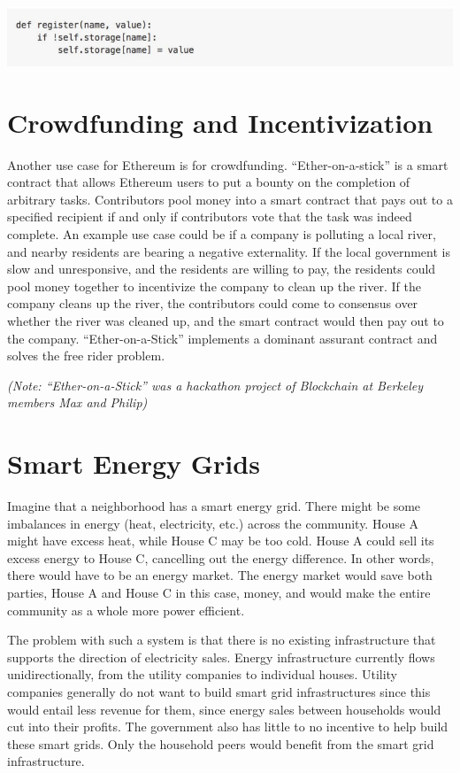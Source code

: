 \documentclass[full.tex]{subfiles}
\begin{document}
    \begin{center}
        \includegraphics[scale=0.5]{public_registry}
    \end{center}
    
    \section*{Crowdfunding and Incentivization}
    
    Another use case for Ethereum is for crowdfunding. ``Ether-on-a-stick'' is a smart contract that allows Ethereum users to put a bounty on the completion of arbitrary tasks. Contributors pool money into a smart contract that pays out to a specified recipient if and only if contributors vote that the task was indeed complete. An example use case could be if a company is polluting a local river, and nearby residents are bearing a negative externality. If the local government is slow and unresponsive, and the residents are willing to pay, the residents could pool money together to incentivize the company to clean up the river. If the company cleans up the river, the contributors could come to consensus over whether the river was cleaned up, and the smart contract would then pay out to the company. ``Ether-on-a-Stick'' implements a dominant assurant contract and solves the free rider problem.
    
    \textit{(Note: ``Ether-on-a-Stick'' was a hackathon project of Blockchain at Berkeley members Max and Philip)}
    
    \section*{Smart Energy Grids}
    
    Imagine that a neighborhood has a smart energy grid. There might be some imbalances in energy (heat, electricity, etc.) across the community. House A might have excess heat, while House C may be too cold. House A could sell its excess energy to House C, cancelling out the energy difference. In other words, there would have to be an energy market. The energy market would save both parties, House A and House C in this case, money, and would make the entire community as a whole more power efficient. 
    
    The problem with such a system is that there is no existing infrastructure that supports the direction of electricity sales. Energy infrastructure currently flows unidirectionally, from the utility companies to individual houses. Utility companies generally do not want to build smart grid infrastructures since this would entail less revenue for them, since energy sales between households would cut into their profits. The government also has little to no incentive to help build these smart grids. Only the household peers would benefit from the smart grid infrastructure. 
    
\end{document}
